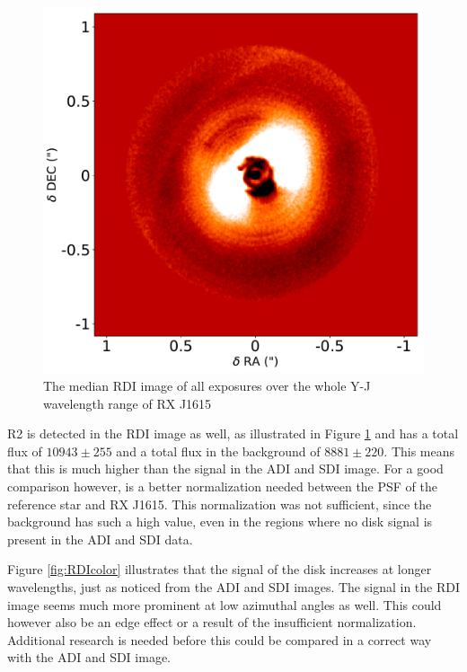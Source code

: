 \documentclass[twoside,single]{lion-msc}
\begin{document}
\begin{figure}
\vspace{-5mm}
\centering
\includegraphics[width=\linewidth]{RDI_tot}
\caption{The median RDI image of all exposures over the whole Y-J wavelength range of RX J1615}
\label{fig:RDI_tot}
\vspace{-7mm}
\end{figure}

R2 is detected in the RDI image as well, as illustrated in Figure \ref{fig:RDI_tot} and has a total flux of $10943 \pm 255$ and a total flux in the background of $8881 \pm 220$. This means that this is much higher than the signal in the ADI and SDI image. For a good comparison however, is a better normalization needed between the PSF of the reference star and RX J1615. This normalization was not sufficient, since the background has such a high value, even in the regions where no disk signal is present in the ADI and SDI data.
\bigskip

Figure \ref{fig:RDIcolor} illustrates that the signal of the disk increases at longer wavelengths, just as noticed from the ADI and SDI images. The signal in the RDI image seems much more prominent at low azimuthal angles as well. This could however also be an edge effect or a result of the insufficient normalization. Additional research is needed before this could be compared in a correct way with the ADI and SDI image.
\end{document}
